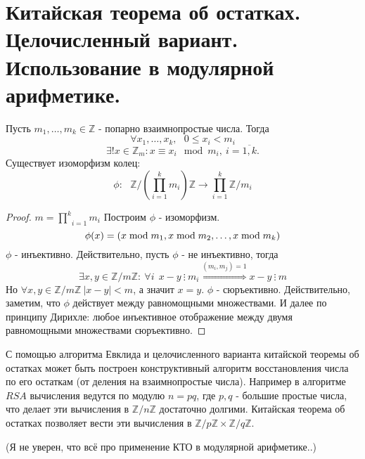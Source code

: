 \section{Китайская теорема об остатках. Целочисленный вариант. Использование в модулярной арифметике.}

\begin{thm}
  Пусть $ m_1, \dots, m_k \in \mathbb{Z} $ - попарно взаимнопростые числа. Тогда
  \[\forall x_1, \dots, x_k, ~~~ 0 \le x_i < m_i  \]
  \[\exists ! x \in \mathbb{Z}_{m}: x \equiv x_i \mod m_i, ~i = \overline{1, k}.\]
Существует изоморфизм колец:
\[\phi:~~~\mathbb{Z}\bigg / ( {\underset{i = 1}{\overset{k}\prod} m_i} ) \mathbb{Z} \rightarrow \underset{i = 1}{\overset{k}\prod} \mathbb{Z}/m_i\]

\end{thm}
\begin{proof}
  $ m =  {\underset{i = 1}{\overset{k}\prod} m_i} $ \newline
  Построим $ \phi $ - изоморфизм.
  \[ \phi(x) = (x \; {\rm mod} \; m_1, x \; {\rm mod} \; m_2, \dots, x \; {\rm mod} \; m_k) \]
  $ \phi $ - инъективно. Действительно, пусть $ \phi $ - не инъективно, тогда
  \[ \exists x, y \in \mathbb{Z}/m\mathbb{Z} : ~ \forall i ~~ x - y ~ \vdots ~ m_i \overset{(m_{i}, m_{j}) = 1}{\Rightarrow} x - y ~ \vdots ~ m \]
  Но $ \forall x, y \in \mathbb{Z}/m\mathbb{Z} ~ |x - y| < m $, а значит $ x = y $. \newline
  $ \phi $ - сюръективно. Действительно, заметим, что $ \phi $ действует между равномощными множествами. И далее по принципу Дирихле: любое инъективное
  отображение между двумя равномощными множествами сюръективно.
\end{proof}

С помощью алгоритма Евклида и целочисленного варианта китайской теоремы об остатках может быть построен
конструктивный алгоритм восстановления числа по его остаткам (от деления на взаимнопростые числа). \newline
Например в алгоритме $ RSA $ вычисления ведутся по модулю $ n = pq $, где $ p, q $ - большие простые числа,
что делает эти вычисления в $ \mathbb{Z}/n\mathbb{Z} $ достаточно долгими. Китайская теорема об остатках 
позволяет вести эти вычисления в $ \mathbb{Z}/p\mathbb{Z} \times \mathbb{Z}/q\mathbb{Z} $. \newline

(Я не уверен, что всё про применение КТО в модулярной арифметике..)

